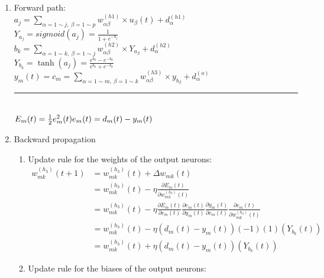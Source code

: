 \documentclass[12pt,a4paper]{article}
\begin{document}
\begin{CJK}{UTF8}{bsmi}
\begin{enumerate}
	\vspace{1cm}
	\item Forward path:
\vspace{0.5cm}
\\	
	$a_j=\sum\limits_{\alpha=1 \sim j,\  \beta=1 \sim p}
w_{\alpha\beta}^{(h1)} \times u_\beta(t)+d_\alpha^{(h1)} $
\vspace{0.5cm}
\\
	$Y_{a_j}=sigmoid(a_j)=\frac{1}{1+ e^{-a_j}}$
\vspace{0.5cm}
\\
	$b_k=\sum\limits_{\alpha=1 \sim k,\  \beta=1 \sim j}
w_{\alpha\beta}^{(h2)} \times Y_{a_\beta}+d_\alpha^{(h2)} $
\vspace{0.5cm}
\\
	$Y_{b_k}=\tanh(a_j)=\frac{e^{b_k}-e^{-b_k}}{e^{b_k}+e^{-b_k}}$
\vspace{0.5cm}
\\
	$y_m(t)=c_m=\sum\limits_{\alpha=1 \sim m,\  \beta=1 \sim k}
	w_{\alpha\beta}^{(h3)} \times y_{b_\beta}+d_\alpha^{(o)} $
\\[0.5cm]
\noindent\rule{\textwidth}{1pt}
\\[0.5cm]
$E_m(t)=\frac{1}{2}e_m^2(t)
\\[0.5cm]
e_m(t)=d_m(t)-y_m(t)
$
\newpage
\item Backward propagation
\begin{enumerate}
	\item Update rule for the weights of the output neurons:
\vspace{0.5cm}
\\
$
	\begin{aligned}
	w_{mk}^{(h_3)}(t+1) & =w_{mk}^{(h_3)}(t)+\Delta w_{mk}(t)
\\[0.5cm]
	& =	w_{mk}^{(h_3)}(t)-\eta\frac{\partial E_m(t)}{\partial w_{mk}^{(h_3)}(t)}
\\[0.5cm]
	& = w_{mk}^{(h_3)}(t)-\eta\frac{\partial E_m(t)}{\partial e_{m}(t)}
	\frac{\partial e_{m}(t)}{\partial y_m(t)}
	\frac{\partial y_m(t)}{\partial c_{m}(t)}
	\frac{\partial c_m(t)}{\partial w_{mk}^{(h_3)}(t)}
\\[0.5cm]
	& = w_{mk}^{(h_3)}(t)-\eta(d_m(t)-y_m(t))(-1)(1)(Y_{b_k}(t))
\\[0.5cm]
	& = w_{mk}^{(h_3)}(t)+\eta(d_m(t)-y_m(t))(Y_{b_k}(t))	
	\end{aligned}
$
	\item Update rule for the biases of the output neurons:
\vspace{0.5cm}

\end{enumerate}
\end{enumerate}
\end{CJK}
\end{document}
